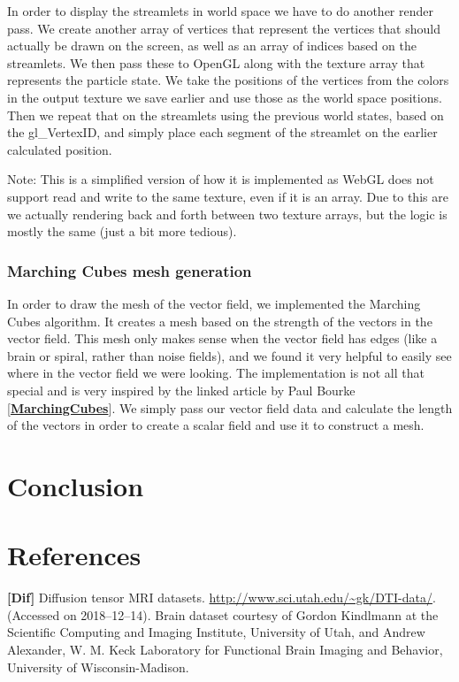 \documentclass{article}
\newcommand{\reference}[1]{[\hyperref[ref:#1]{\textbf{#1}}]}
\begin{document}
In order to display the streamlets in world space we have to do another render pass. We create another array of vertices that represent the vertices that should actually be drawn on the screen, as well as an array of indices based on the streamlets. We then pass these to OpenGL along with the texture array that represents the particle state. We take the positions of the vertices from the colors in the output texture we save earlier and use those as the world space positions. Then we repeat that on the streamlets using the previous world states, based on the gl\_VertexID, and simply place each segment of the streamlet on the earlier calculated position.

Note: This is a simplified version of how it is implemented as WebGL does not support read and write to the same texture, even if it is an array. Due to this are we actually rendering back and forth between two texture arrays, but the logic is mostly the same (just a bit more tedious).

\subsubsection*{Marching Cubes mesh generation}

In order to draw the mesh of the vector field, we implemented the Marching Cubes algorithm. It creates a mesh based on the strength of the vectors in the vector field. This mesh only makes sense when the vector field has edges (like a brain or spiral, rather than noise fields), and we found it very helpful to easily see where in the vector field we were looking. The implementation is not all that special and is very inspired by the linked article by Paul Bourke \reference{MarchingCubes}. We simply pass our vector field data and calculate the length of the vectors in order to create a scalar field and use it to construct a mesh.

\section*{Conclusion}


\section*{References}

\textbf{[Dif]}\label{ref:Dif}
Diffusion tensor MRI datasets. \url{http://www.sci.utah.edu/~gk/DTI-data/}. (Accessed on 2018--12--14). Brain dataset courtesy of Gordon Kindlmann at the Scientific Computing and Imaging Institute, University of Utah, and Andrew Alexander, W. M. Keck Laboratory for Functional Brain Imaging and Behavior, University of Wisconsin-Madison.
\end{document}
